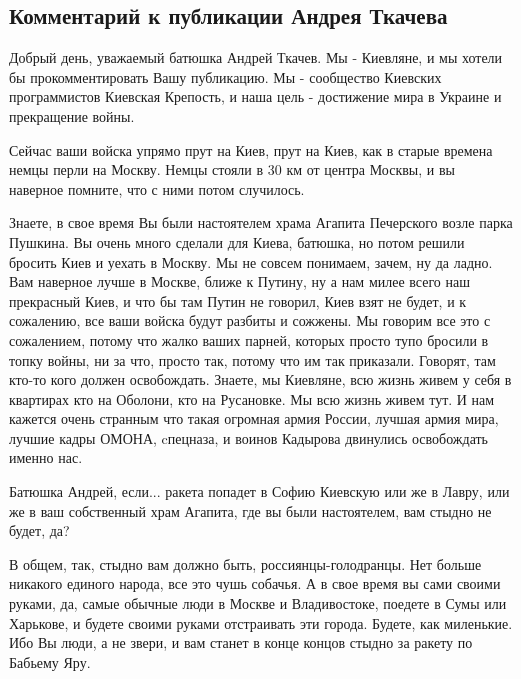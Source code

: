  
 
 
 
 

\subsection{Комментарий к публикации Андрея Ткачева}

Добрый день, уважаемый батюшка Андрей Ткачев. Мы - Киевляне, и мы хотели бы
прокомментировать Вашу публикацию.  Мы - сообщество Киевских программистов
Киевская Крепость, и наша цель - достижение мира в Украине и прекращение войны.

Сейчас ваши войска упрямо прут на Киев, прут на Киев, как в старые времена
немцы перли на Москву. Немцы стояли в 30 км от центра Москвы, и вы наверное
помните, что с ними потом случилось. 

Знаете, в свое время Вы были настоятелем храма Агапита Печерского возле парка
Пушкина. Вы очень много сделали для Киева, батюшка, но потом решили бросить
Киев и уехать в Москву.  Мы не совсем понимаем, зачем, ну да ладно. Вам
наверное лучше в Москве, ближе к Путину, ну а нам милее всего наш прекрасный
Киев, и что бы там Путин не говорил, Киев взят не будет, и к сожалению, все
ваши войска будут разбиты и сожжены. Мы говорим все это с сожалением, потому
что жалко ваших парней, которых просто тупо бросили в топку войны, ни за что,
просто так, потому что им так приказали. Говорят, там кто-то кого должен
освобождать. Знаете, мы Киевляне, всю жизнь живем у себя в квартирах кто на
Оболони, кто на Русановке. Мы всю жизнь живем тут. И нам кажется очень странным
что такая огромная армия России, лучшая армия мира, лучшие кадры ОМОНА,
cпецназа, и воинов Кадырова двинулись освобождать именно нас.

Батюшка Андрей, если... ракета попадет в Софию Киевскую или же в Лавру, или же
в ваш собственный храм Агапита, где вы были настоятелем, вам стыдно не будет,
да?

В общем, так, стыдно вам должно быть, россиянцы-голодранцы. Нет больше никакого
единого народа, все это чушь собачья. А в свое время вы сами своими руками, да,
самые обычные люди в Москве и Владивостоке, поедете в Сумы или Харькове, и
будете своими руками отстраивать эти города. Будете, как миленькие.  Ибо Вы
люди, а не звери,  и вам станет в конце концов стыдно за ракету по Бабьему Яру.

